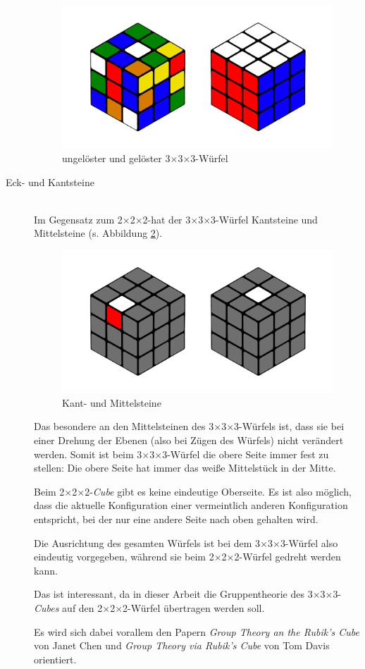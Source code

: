 \documentclass[12pt,a4paper, usenames, dvipsnames]{article}
\newcommand{\Ttwo}{2$\times$2$\times$2-}
\newcommand{\Tthree}{3$\times$3$\times$3-}
\begin{document}
\begin{description}
\begin{figure}[h]
\centering
\includegraphics[scale=0.11]{3x3_sc_so.png}
\caption[ungelöster und gelöster \Tthree Würfel]{ungelöster und gelöster \Tthree Würfel}
\label{5}
\end{figure}


\item[Eck- und Kantsteine] \ \\
Im Gegensatz zum \Ttwo hat der \Tthree Würfel Kantsteine und Mittelsteine (s. Abbildung \ref{6}).
\begin{figure}[h]
\centering
\includegraphics[scale=0.11]{mittelkant.png}
\caption[Kant- und Mittelsteine]{Kant- und Mittelsteine}
\label{6}
\end{figure}
Das besondere an den Mittelsteinen des \Tthree Würfels ist, dass sie bei einer Drehung der Ebenen (also bei Zügen des Würfels) nicht verändert werden. Somit ist beim \Tthree Würfel die obere Seite immer fest zu stellen: Die obere Seite hat immer das weiße Mittelstück in der Mitte. 

Beim \Ttwo \textit{Cube} gibt es keine eindeutige Oberseite. Es ist also möglich, dass die aktuelle Konfiguration einer vermeintlich anderen Konfiguration entspricht, bei der nur eine andere Seite nach oben gehalten wird.

Die Ausrichtung des gesamten Würfels ist bei dem \Tthree Würfel also eindeutig vorgegeben, während sie beim \Ttwo Würfel gedreht werden kann.  

Das ist interessant, da in dieser Arbeit die Gruppentheorie des \Tthree \textit{Cubes} auf den \Ttwo Würfel übertragen werden soll.

Es wird sich dabei vorallem den Papern \textit{Group Theory an the Rubik's Cube} von Janet Chen \cite{JC} und \textit{Group Theory via Rubik's Cube} von Tom Davis \cite{TD} orientiert.


\end{description}
\end{document}
